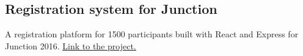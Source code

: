 \documentclass[]{deedy-resume}
\begin{document}
\begin{minipage}[t]{0.66\textwidth}
\subsection{Registration system for Junction}
A registration platform for 1500 participants built with React and Express for Junction 2016. \href{https://github.com/gamleksi/Junction-Registration}{\underline{Link to the project.}} 
\sectionsep



% 
% 

\end{minipage} 
\end{document}
